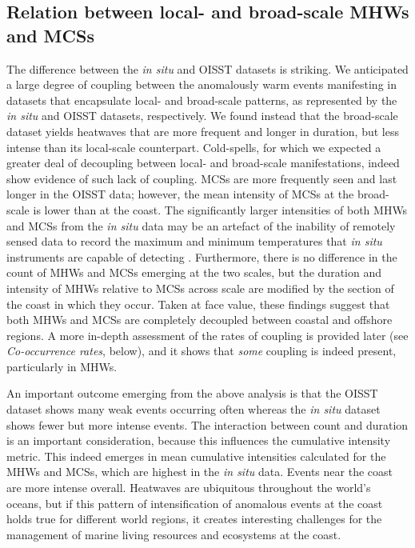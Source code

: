 \documentclass[a4paper,10pt,review]{elsarticle}
\begin{document}
\subsection{Relation between local- and broad-scale MHWs and MCSs}
The difference between the \emph{in situ} and OISST datasets is striking. We anticipated a large degree of coupling between the anomalously warm events manifesting in datasets that encapsulate local- and broad-scale patterns, as represented by the \emph{in situ} and OISST datasets, respectively. We found instead that the broad-scale dataset yields heatwaves that are more frequent and longer in duration, but less intense than its local-scale counterpart. Cold-spells, for which we expected a greater deal of decoupling between local- and broad-scale manifestations, indeed show evidence of such lack of coupling. MCSs are more frequently seen and last longer in the OISST data; however, the mean intensity of MCSs at the broad-scale is lower than at the coast. The significantly larger intensities of both MHWs and MCSs from the \emph{in situ} data may be an artefact of the inability of remotely sensed data to record the maximum and minimum temperatures that \emph{in situ} instruments are capable of detecting \citep{Smale2009}. Furthermore, there is no difference in the count of MHWs and MCSs emerging at the two scales, but the duration and intensity of MHWs relative to MCSs across scale are modified by the section of the coast in which they occur. Taken at face value, these findings suggest that both MHWs and MCSs are completely decoupled between coastal and offshore regions. A more in-depth assessment of the rates of coupling is provided later (see \emph{Co-occurrence rates}, below), and it shows that \emph{some} coupling is indeed present, particularly in MHWs.

An important outcome emerging from the above analysis is that the OISST dataset shows many weak events occurring often whereas the \emph{in situ} dataset shows fewer but more intense events. The interaction between count and duration is an important consideration, because this influences the cumulative intensity metric. This indeed emerges in mean cumulative intensities calculated for the MHWs and MCSs, which are highest in the \emph{in situ} data. Events near the coast are more intense overall. Heatwaves are ubiquitous throughout the world's oceans, but if this pattern of intensification of anomalous events at the coast holds true for different world regions, it creates interesting challenges for the management of marine living resources and ecosystems at the coast.
\end{document}
